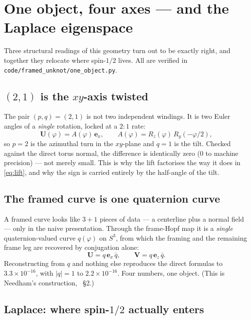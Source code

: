 \documentclass[11pt,a4paper]{article}
\begin{document}
\section{One object, four axes --- and the Laplace eigenspace}
\label{sec:oneobject}

Three structural readings of this geometry turn out to be exactly right,
and together they relocate where spin-$1/2$ lives.  All are verified in
\nolinkurl{code/framed_unknot/one_object.py}.

\subsection{$(2,1)$ is the $xy$-axis twisted}

The pair $(p,q) = (2,1)$ is not two independent windings.  It is two
Euler angles of a \emph{single} rotation, locked at a $2\!:\!1$ rate:
\begin{equation}
\bm{U}(\varphi) = A(\varphi)\,\bm{e}_x,
\qquad A(\varphi) = R_z(\varphi)\,R_y(-\varphi/2),
\end{equation}
so $p = 2$ is the azimuthal turn in the $xy$-plane and $q = 1$ is the
tilt.  Checked against the direct torus normal, the difference is
identically zero (0 to machine precision) --- not merely small.  This is why the
lift factorises the way it does in \eqref{eq:lift}, and why the sign is
carried entirely by the half-angle of the tilt.

\subsection{The framed curve is one quaternion curve}

A framed curve looks like $3+1$ pieces of data --- a centerline plus a
normal field --- only in the naive presentation.  Through the frame-Hopf
map it is a \emph{single} quaternion-valued curve $q(\varphi)$ on $S^3$,
from which the framing and the remaining frame leg are recovered by
conjugation alone:
\begin{equation}
\bm{U} = q\,\bm{e}_x\,\bar q, \qquad \bm{V} = q\,\bm{e}_z\,\bar q .
\end{equation}
Reconstructing from $q$ and nothing else reproduces the direct formulas
to $3.3\times10^{-16}$, with $|q| = 1$ to $2.2\times10^{-16}$.  Four
numbers, one object.  (This is Needham's construction,
\cite{needham2017}~\S2.)

\subsection{Laplace: where spin-$1/2$ actually enters}
\end{document}
